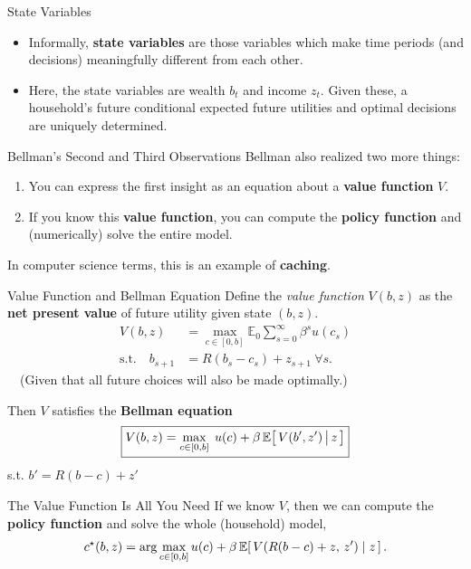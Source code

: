 \documentclass[10pt,aspectratio=169]{beamer}
\begin{document}
\begin{frame}{State Variables}
  \begin{itemize}
    \item Informally, \textbf{state variables} are those variables which make time periods (and decisions) meaningfully different from each other.
    \item Here, the state variables are wealth $b_t$ and income $z_t$. Given these, a household's future conditional expected future utilities and optimal decisions are uniquely determined.
  \end{itemize}
\end{frame}

\begin{frame}{Bellman's Second and Third Observations}
  Bellman also realized two more things:
  \begin{enumerate}
    \item[2.] You can express the first insight as an equation about a \textbf{value function} $V$.
    \item[3.] If you know this \textbf{value function}, you can compute the \textbf{policy function} and (numerically) solve the entire model.
  \end{enumerate}
  In computer science terms, this is an example of \textbf{caching}.
\end{frame}

\begin{frame}{Value Function and Bellman Equation}
  Define the \emph{value function} $V(b, z)$ as the \textbf{net present value} of future utility given state $(b, z)$.
  \begin{align*}
    V(b, z) &= \max_{c\in[0,b]} \mathbb{E}_0 \sum_{s=0}^\infty \beta^{s} u(c_s)\\
    \text{s.t.} \quad b_{s+1} &= R(b_s - c_s) + z_{s+1}\ \forall s.
  \end{align*}
  $\quad$(Given that all future choices will also be made optimally.)

  Then $V$ satisfies the \textbf{Bellman equation}
  \[
    \boxed{V(b, z) = \max_{c \in [0, b]} \; u(c) + \beta \, \mathbb{E}\!\left[\, V(b', z') \,\big|\, z \,\right]}
  \]
  s.t. $b' = R(b-c) + z'$
\end{frame}

\begin{frame}{The Value Function Is All You Need}
  If we know $V$, then we can compute the \textbf{policy function} and solve the whole (household) model,
  \[
  c^\star(b, z) = \arg\max_{c \in [0, b]} u(c) + \beta \, \mathbb{E}\!\left[\, V(R(b-c) + z,\, z') \mid z \,\right].
  \]
\end{frame}
\end{document}

